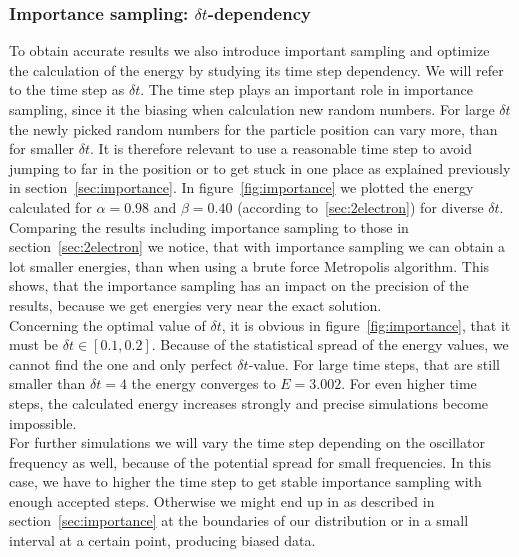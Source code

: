 \subsubsection{Importance sampling: $\delta t$-dependency}
To obtain accurate results we also introduce important sampling and optimize the calculation of the energy by studying its time step dependency. We will refer to the time step as $\delta t$. The time step plays an important role in importance sampling, since it the biasing when calculation new random numbers. For large $\delta t$ the newly picked random numbers for the particle position can vary more, than for smaller $\delta t$. It is therefore relevant to use a reasonable time step to avoid jumping to far in the position or to get stuck in one place as explained previously in section~\ref{sec:importance}. In figure~\ref{fig:importance} we plotted the energy calculated for $\alpha = 0.98$ and $\beta = 0.40$ (according to~\ref{sec:2electron}) for diverse $\delta t$. Comparing the results including importance sampling to those in section~\ref{sec:2electron} we notice, that with importance sampling we can obtain a lot smaller energies, than when using a brute force Metropolis algorithm. This shows, that the importance sampling has an impact on the precision of the results, because we get energies very near the exact solution.\\
Concerning the optimal value of $\delta t$, it is obvious in figure~\ref{fig:importance}, that it must be $\delta t \in [0.1,0.2]$. Because of the statistical spread of the energy values, we cannot find the one and only perfect $\delta t$-value. For large time steps, that are still smaller than $\delta t= 4$ the energy converges to $E=3.002$. For even higher time steps, the calculated energy increases strongly and precise simulations become impossible.\\
For further simulations we will vary the time step depending on the oscillator frequency as well, because of the potential spread for small frequencies. In this case, we have to higher the time step to get stable importance sampling with enough accepted steps. Otherwise we might end up in as described in section~\ref{sec:importance} at the boundaries of our distribution or in a small interval at a certain point, producing biased data.

